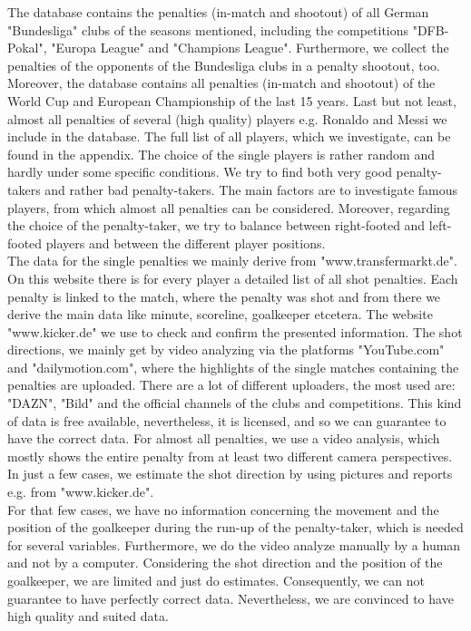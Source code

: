 \documentclass[12pt,dvipsnames]{article}%
\begin{document}
 \vspace{+0.3cm}
 

The database contains the penalties (in-match and shootout) of all German "Bundesliga" clubs of the seasons mentioned, including the competitions "DFB-Pokal", "Europa League" and "Champions League". Furthermore, we collect the penalties of the opponents of the Bundesliga clubs in a penalty shootout, too. Moreover, the database contains all penalties (in-match and shootout) of the World Cup and European Championship of the last 15 years. Last but not least, almost all penalties of several (high quality) players e.g. Ronaldo and Messi we include in the database. The full list of all players, which we investigate, can be found in the appendix. The choice of the single players is rather random and hardly under some specific conditions. We try to find both very good penalty-takers and rather bad penalty-takers. The main factors are to investigate famous players, from which almost all penalties can be considered. Moreover, regarding the choice of the penalty-taker, we try to balance between right-footed and left-footed players and between the different player positions.  \\
The data for the single penalties we mainly derive from "www.transfermarkt.de". On this website there is for every player a detailed list of all shot penalties. Each penalty is linked to the match, where the penalty was shot and from there we derive the main data like minute, scoreline, goalkeeper etcetera. The website "www.kicker.de" we use to check and confirm the presented information. The shot directions, we mainly get by video analyzing via the platforms "YouTube.com" and "dailymotion.com", where the highlights of the single matches containing the penalties are uploaded. There are a lot of different uploaders, the most used are: "DAZN", "Bild" and the official channels of the clubs and competitions. This kind of data is free available, nevertheless, it is licensed, and so we can guarantee to have the correct data. For almost all penalties, we use a video analysis, which mostly shows the entire penalty from at least two different camera perspectives. In just a few cases, we estimate the shot direction by using pictures and reports e.g. from "www.kicker.de".  \\
For that few cases, we have no information concerning the movement and the position of the goalkeeper during the run-up of the penalty-taker, which is needed for several variables. Furthermore, we do the video analyze manually by a human and not by a computer. Considering the shot direction and the position of the goalkeeper, we are limited and just do estimates. Consequently, we can not guarantee to have perfectly correct data. Nevertheless, we are convinced to have high quality and suited data.
%
\end{document}

